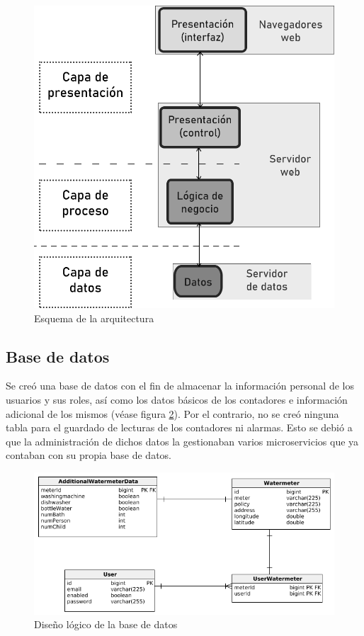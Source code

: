\documentclass[pdftex,11pt,a4paper]{book}
\begin{document}
 \begin{figure}[h]
 \centering
 \includegraphics [scale=0.30] {images/diagramas/arquitectura.png}
 \caption{Esquema de la arquitectura} \label{fig:arquitectura}
 \end{figure}

\subsection{Base de datos}

Se creó una base de datos con el fin de almacenar la información personal de los usuarios y sus roles, así como los datos básicos de los contadores e información adicional de los mismos (véase figura \ref{fig:bbdd}). Por el contrario, no se creó ninguna tabla para el guardado de lecturas de los contadores ni alarmas. Esto se debió a que la administración de dichos datos la gestionaban varios microservicios que ya contaban con su propia base de datos. 


 \begin{figure}[H]
 \centering
 \includegraphics [scale=0.85] {images/diagramas/bbdd.png}
 \caption{Diseño lógico de la base de datos} \label{fig:bbdd}
 \end{figure}
\end{document}
